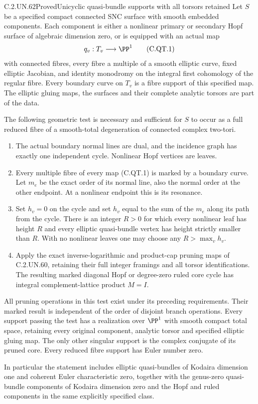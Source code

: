 \begin{statement}{C.2.UN.62}{Proved}{Unicyclic quasi-bundle supports with all torsors retained}
Let $S$ be a specified compact connected SNC surface with smooth
embedded components. Each component is either a nonlinear primary
or secondary Hopf surface of algebraic dimension zero, or is
equipped with an actual map
\[
                         q_v:T_v\longrightarrow\PP^1
\tag{C.QT.1}
\]
with connected fibres, every fibre a multiple of a smooth elliptic
curve, fixed elliptic Jacobian, and identity monodromy on the
integral first cohomology of the regular fibre. Every boundary
curve on $T_v$ is a fibre support of this specified map. The
elliptic gluing maps, the surfaces and their complete analytic
torsors are part of the data.

The following geometric test is necessary and sufficient for
$S$ to occur as a full reduced fibre of a smooth-total
degeneration of connected complex two-tori.
\begin{enumerate}
\item The actual boundary normal lines are dual, and the incidence
graph has exactly one independent cycle. Nonlinear Hopf vertices
are leaves.
\item Every multiple fibre of every map (C.QT.1) is marked by
a boundary curve. Let $m_e$ be the exact order of its normal
line, also the normal order at the other endpoint. At a
nonlinear endpoint this is its resonance.
\item Set $h_v=0$ on the cycle and set $h_v$ equal to the sum
of the $m_e$ along its path from the cycle. There is an integer
$R>0$ for which every nonlinear leaf has height $R$ and every
elliptic quasi-bundle vertex has height strictly smaller than
$R$. With no nonlinear leaves one may choose any
$R>\max_v h_v$.
\item Apply the exact inverse-logarithmic and product-cap
pruning maps of C.2.UN.60, retaining their full integer
framings and all torsor identifications. The resulting
marked diagonal Hopf or degree-zero ruled core cycle has
integral complement-lattice product $M=I$.
\end{enumerate}
All pruning operations in this test exist under its preceding
requirements. Their marked result is independent of the order
of disjoint branch operations. Every support passing the test
has a realization over $\PP^1$ with smooth compact total space,
retaining every original component, analytic torsor and
specified elliptic gluing map. The only other singular support
is the complex conjugate of its pruned core. Every reduced
fibre support has Euler number zero.

In particular the statement includes elliptic quasi-bundles
of Kodaira dimension one and coherent Euler characteristic
zero, together with the genus-zero quasi-bundle components
of Kodaira dimension zero and the Hopf and ruled components
in the same explicitly specified class.
\end{statement}

